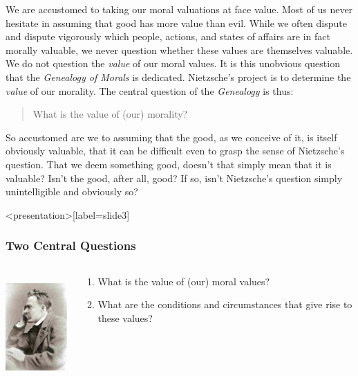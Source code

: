 We are accustomed to taking our moral valuations at face value. Most of us never hesitate in assuming that good has more value than evil. While we often dispute and dispute vigorously which people, actions, and states of affairs are in fact morally valuable, we never question whether these values are themselves valuable. We do not question the \emph{value} of our moral values. It is this unobvious question that the \emph{Genealogy of Morals} is dedicated. Nietzsche's project is to determine the \emph{value} of our morality. The central question of the \emph{Genealogy} is thus:
\begin{quote}
    What is the value of (our) morality?
\end{quote}
So accustomed are we to assuming that the good, as we conceive of it, is itself obviously valuable, that it can be difficult even to grasp the sense of Nietzsche's question. That we deem something good, doesn't that simply mean that it is valuable? Isn't the good, after all, good? If so, isn't Nietzsche's question simply unintelligible and obviously so? \change

\begin{frame}<presentation>[label=slide3]
    \frametitle{Two Central Questions}
        \begin{columns}
            \begin{column}{3cm}
                \includegraphics[height=4cm]{../../graphics/nietzsche.jpg}
            \end{column}
            \begin{column}{7cm}
                \begin{enumerate}
                    \item What is the value of (our) moral values?
                    \item What are the conditions and circumstances that give rise to these values?
                \end{enumerate}
            \end{column}
        \end{columns}
\end{frame}

